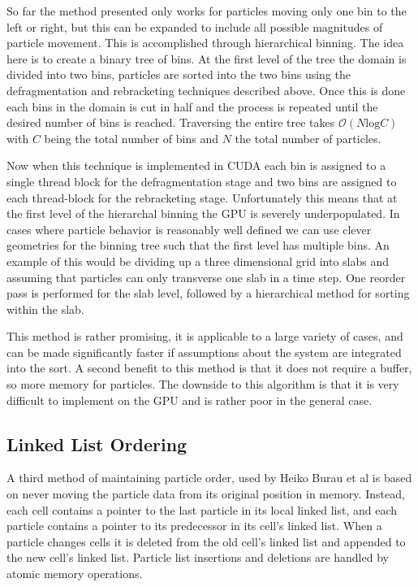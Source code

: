 	So far the method presented only works for particles moving only one bin to the left or right, but this can be expanded to include all possible magnitudes of particle movement. This is accomplished through hierarchical binning. The idea here is to create a binary tree of bins. At the first level of the tree the domain is divided into two bins, particles are sorted into the two bins using the defragmentation and rebracketing techniques described above. Once this is done each bins in the domain is cut in half and the process is repeated until the desired number of bins is reached. Traversing the entire tree takes $\mathcal{O}(N \mathrm{log} C)$ with $C$ being the total number of bins and $N$ the total number of particles. \cite{Stantchev2008}

Now when this technique is implemented in CUDA each bin is assigned to a single thread block for the defragmentation stage and two bins are assigned to each thread-block for the rebracketing stage.  Unfortunately this means that at the first level of the hierarchal binning the GPU is severely underpopulated. In cases where particle behavior is reasonably well defined we can use clever geometries for the binning tree such that the first level has multiple bins. An example of this would be dividing up a three dimensional grid into slabs and assuming that particles can only transverse one slab in a time step. One reorder pass is performed for the slab level, followed by a hierarchical method for sorting within the slab. 

This method is rather promising, it is applicable to a large variety of cases, and can be made significantly faster if assumptions about the system are integrated into the sort. A second benefit to this method is that it does not require a buffer, so more memory for particles. The downside to this algorithm is that it is very difficult to implement on the GPU and is rather poor in the general case. 


	\subsection{Linked List Ordering}
	A third method of maintaining particle order, used by Heiko Burau et al is based on never moving the particle data from its original position in memory. Instead, each cell contains a pointer to the last particle in its local linked list, and each particle contains a pointer to its predecessor in its cell's linked list. When a particle changes cells it is deleted from the old cell's linked list and appended to the new cell's linked list. Particle list insertions and deletions are handled by atomic memory operations. \cite{Burau2010}

